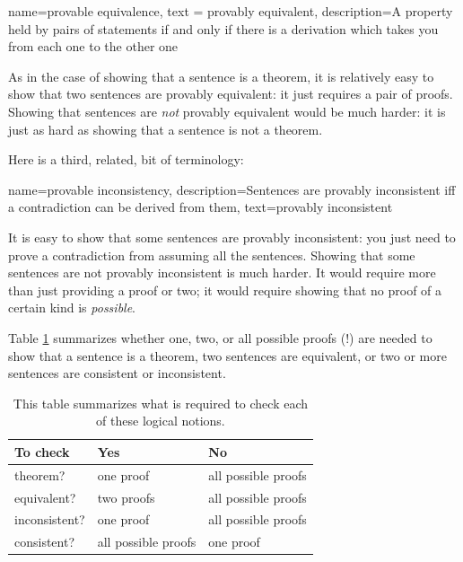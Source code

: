 {
  name=provable equivalence,
  text = provably equivalent,
description={A property held by pairs of statements if and only if there is a derivation which takes you from each one to the other one}
}


As in the case of showing that a sentence is a theorem, it is relatively easy to show that two sentences are provably equivalent: it just requires a pair of proofs. Showing that sentences are \emph{not} provably equivalent would be much harder: it is just as hard as showing that a sentence is not a theorem. 

Here is a third, related, bit of terminology:
        
{    name={provable inconsistency}, 
  description={Sentences are provably inconsistent iff a contradiction can be derived from them},
    text={provably inconsistent}
}

It is easy to show that some sentences are provably inconsistent: you just need to prove a contradiction from assuming all the sentences. Showing that some sentences are not provably inconsistent is much harder. It would require more than just providing a proof or two; it would require showing that no proof of a certain kind is \emph{possible}.

Table \ref{table.one-mult-proofs} summarizes whether one, two, or all possible proofs (!) are needed to show that a sentence is a theorem, two sentences are equivalent, or two or more sentences are consistent or inconsistent. 

\begin{table}\centering\sffamily\footnotesize
{}
\begin{tabular}{@{}l l l@{}}\toprule
To check & Yes & No\\\midrule
theorem? & one proof & all possible proofs\\
equivalent? & two proofs & all possible proofs\\
inconsistent? &  one proof  & all possible proofs\\
consistent? & all possible proofs & one proof\\
\bottomrule
\end{tabular}
\caption{This table summarizes what is required to check each of these logical notions.}\label{table.one-mult-proofs}
\end{table}


